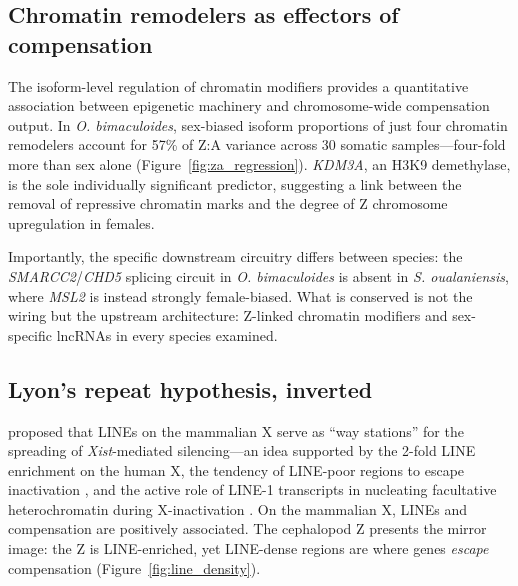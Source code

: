 \documentclass[12pt]{article}
\newcommand{\citep}{\parencite}
\begin{document}
\subsection*{Chromatin remodelers as effectors of compensation}

The isoform-level regulation of chromatin modifiers
provides a quantitative association between epigenetic machinery
and chromosome-wide compensation output.
In \textit{O. bimaculoides}, sex-biased isoform proportions
of just four chromatin remodelers account for 57\% of Z:A variance
across 30 somatic samples---four-fold more than sex alone
(Figure~\ref{fig:za_regression}).
\textit{KDM3A}, an H3K9 demethylase, is the sole individually significant predictor,
suggesting a link between the removal of repressive chromatin marks
and the degree of Z chromosome upregulation in females.

Importantly, the specific downstream circuitry differs between species:
the \textit{SMARCC2}/\textit{CHD5} splicing circuit in \textit{O. bimaculoides}
is absent in \textit{S. oualaniensis},
where \textit{MSL2} is instead strongly female-biased.
What is conserved is not the wiring
but the upstream architecture:
Z-linked chromatin modifiers and sex-specific lncRNAs
in every species examined.

\subsection*{Lyon's repeat hypothesis, inverted}

\textcite{lyon1998x} proposed that LINEs on the mammalian X serve as
``way stations'' for the spreading of \textit{Xist}-mediated silencing---an
idea supported by the 2-fold LINE enrichment on the human X,
the tendency of LINE-poor regions to escape inactivation
\citep{bailey2000molecular},
and the active role of LINE-1 transcripts in nucleating
facultative heterochromatin during X-inactivation
\citep{chow2010line}.
On the mammalian X, LINEs and compensation are positively associated.
The cephalopod Z presents the mirror image:
the Z is LINE-enriched, yet LINE-dense regions are where genes
\textit{escape} compensation (Figure~\ref{fig:line_density}).
\end{document}
